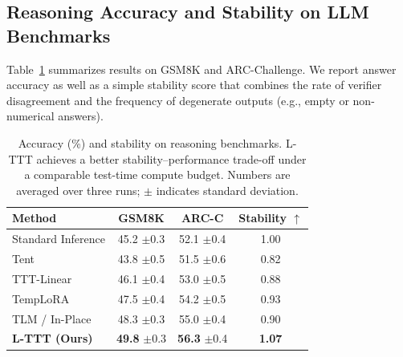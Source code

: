 \documentclass{article}
\theoremstyle{plain}
\theoremstyle{definition}
\theoremstyle{remark}
\begin{document}
\subsection{Reasoning Accuracy and Stability on LLM Benchmarks}

Table~\ref{tab:main_results} summarizes results on GSM8K and ARC-Challenge. We report answer accuracy as well as a simple stability score that combines the rate of verifier disagreement and the frequency of degenerate outputs (e.g., empty or non-numerical answers).

\begin{table}[t]
\caption{Accuracy (\%) and stability on reasoning benchmarks. L-TTT achieves a better stability--performance trade-off under a comparable test-time compute budget. Numbers are averaged over three runs; $\pm$ indicates standard deviation.}
\label{tab:main_results}
\vskip 0.15in
\begin{center}
\begin{small}
\begin{sc}
\setlength{\tabcolsep}{2.5pt}

\begin{tabular}{p{4.0cm}ccc}
\toprule
Method & GSM8K & ARC-C & Stability $\uparrow$ \\
\midrule
Standard Inference & 45.2 {\scriptsize$\pm$0.3} & 52.1 {\scriptsize$\pm$0.4} & 1.00 \\
Tent \cite{wang2021tent}   & 43.8 {\scriptsize$\pm$0.5} & 51.5 {\scriptsize$\pm$0.6} & 0.82 \\
TTT-Linear \cite{sun2023learning} & 46.1 {\scriptsize$\pm$0.4} & 53.0 {\scriptsize$\pm$0.5} & 0.88 \\
TempLoRA \cite{templora2024} & 47.5 {\scriptsize$\pm$0.4} & 54.2 {\scriptsize$\pm$0.5} & 0.93 \\
TLM / In-Place \cite{tlm2025,inplacettt2025} & 48.3 {\scriptsize$\pm$0.3} & 55.0 {\scriptsize$\pm$0.4} & 0.90 \\
\midrule
\textbf{L-TTT (Ours)} & \textbf{49.8} {\scriptsize$\pm$0.3} & \textbf{56.3} {\scriptsize$\pm$0.4} & \textbf{1.07} \\
\bottomrule
\end{tabular}
\end{sc}
\end{small}
\end{center}
\vskip -0.1in
\end{table}
\end{document}
